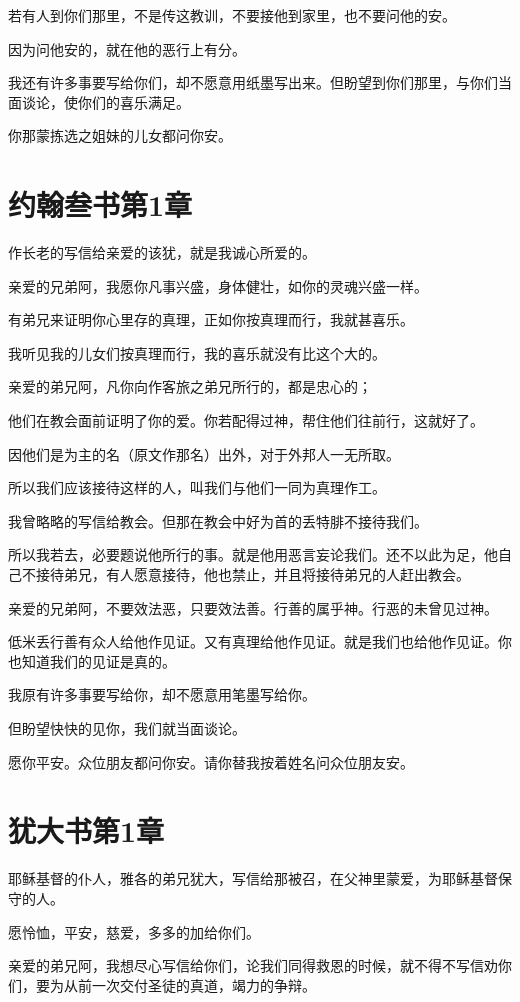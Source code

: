 \documentclass[12pt,oneside]{book}
\begin{document}
若有人到你们那里，不是传这教训，不要接他到家里，也不要问他的安。

因为问他安的，就在他的恶行上有分。

我还有许多事要写给你们，却不愿意用纸墨写出来。但盼望到你们那里，与你们当面谈论，使你们的喜乐满足。

你那蒙拣选之姐妹的儿女都问你安。

\chapter{约翰叁书第1章}
作长老的写信给亲爱的该犹，就是我诚心所爱的。

亲爱的兄弟阿，我愿你凡事兴盛，身体健壮，如你的灵魂兴盛一样。

有弟兄来证明你心里存的真理，正如你按真理而行，我就甚喜乐。

我听见我的儿女们按真理而行，我的喜乐就没有比这个大的。

亲爱的弟兄阿，凡你向作客旅之弟兄所行的，都是忠心的；

他们在教会面前证明了你的爱。你若配得过神，帮住他们往前行，这就好了。

因他们是为主的名（原文作那名）出外，对于外邦人一无所取。

所以我们应该接待这样的人，叫我们与他们一同为真理作工。

我曾略略的写信给教会。但那在教会中好为首的丢特腓不接待我们。

所以我若去，必要题说他所行的事。就是他用恶言妄论我们。还不以此为足，他自己不接待弟兄，有人愿意接待，他也禁止，并且将接待弟兄的人赶出教会。

亲爱的兄弟阿，不要效法恶，只要效法善。行善的属乎神。行恶的未曾见过神。

低米丢行善有众人给他作见证。又有真理给他作见证。就是我们也给他作见证。你也知道我们的见证是真的。

我原有许多事要写给你，却不愿意用笔墨写给你。

但盼望快快的见你，我们就当面谈论。

愿你平安。众位朋友都问你安。请你替我按着姓名问众位朋友安。

\chapter{犹大书第1章}
耶稣基督的仆人，雅各的弟兄犹大，写信给那被召，在父神里蒙爱，为耶稣基督保守的人。

愿怜恤，平安，慈爱，多多的加给你们。

亲爱的弟兄阿，我想尽心写信给你们，论我们同得救恩的时候，就不得不写信劝你们，要为从前一次交付圣徒的真道，竭力的争辩。
\end{document}
